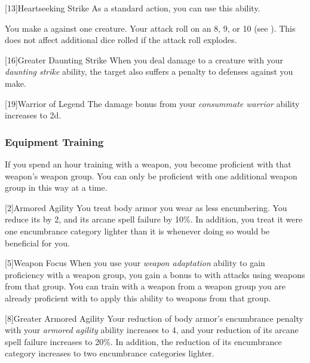             [13]{Heartseeking Strike} As a standard action, you can use this ability.
            \begin{ability}
                \begin{spelleffects}
                    \spelleffect You make a  against one creature.
                    Your attack roll  on an 8, 9, or 10 (see ).
                    This does not affect additional dice rolled if the attack roll explodes.
                \end{spelleffects}
            \end{ability}

            [16]{Greater Daunting Strike}
            When you deal damage to a creature with your \textit{daunting strike} ability, the target also suffers a  penalty to defenses against  you make.

            [19]{Warrior of Legend}
            The damage bonus from your \textit{consummate warrior} ability increases to \plus2d.

        \subsubsection{Equipment Training}
            If you spend an hour training with a weapon, you become proficient with that weapon's weapon group.
            You can only be proficient with one additional weapon group in this way at a time.

            [2]{Armored Agility}
            You treat body armor you wear as less encumbering.
            You reduce its  by 2, and its arcane spell failure by 10\%.
            In addition, you treat it were one encumbrance category lighter than it is whenever doing so would be beneficial for you.

            [5]{Weapon Focus} 
            When you use your \textit{weapon adaptation} ability to gain proficiency with a weapon group, you gain a  bonus to  with attacks using weapons from that group.
            You can train with a weapon from a weapon group you are already proficient with to apply this ability to weapons from that group.

            [8]{Greater Armored Agility}
            Your reduction of body armor's encumbrance penalty with your \textit{armored agility} ability increases to 4, and your reduction of its arcane spell failure increases to 20\%.
            In addition, the reduction of its encumbrance category increases to two encumbrance categories lighter.

